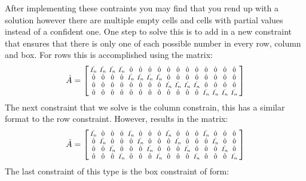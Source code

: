 \documentclass[12pt]{article}
\begin{document}
After implementing these contraints you may find that you rend up with a solution however there are multiple empty cells and cells with partial values instead of a
confident one. One step to solve this is to add in a new constraint that ensures that there is only one of each possible number in every row, column and box.
For rows this is accomplished using the matrix:
$$
\hat{A} =
\begin{bsmallmatrix}
\hat{I_n} & \hat{I_n} & \hat{I_n} & \hat{I_n} & \hat{0} & \hat{0} & \hat{0} & \hat{0} & \hat{0} & \hat{0} & \hat{0} & \hat{0} & \hat{0} & \hat{0} & \hat{0} & \hat{0} \\
\hat{0} & \hat{0} & \hat{0} & \hat{0} & \hat{I_n} & \hat{I_n} & \hat{I_n} & \hat{I_n} & \hat{0} & \hat{0} & \hat{0} & \hat{0} & \hat{0} & \hat{0} & \hat{0} & \hat{0} \\
\hat{0} & \hat{0} & \hat{0} & \hat{0} & \hat{0} & \hat{0} & \hat{0} & \hat{0} & \hat{I_n} & \hat{I_n} & \hat{I_n} & \hat{I_n} & \hat{0} & \hat{0} & \hat{0} & \hat{0} \\
\hat{0} & \hat{0} & \hat{0} & \hat{0} & \hat{0} & \hat{0} & \hat{0} & \hat{0} & \hat{0} & \hat{0} & \hat{0} & \hat{0} & \hat{I_n} & \hat{I_n} & \hat{I_n} & \hat{I_n} \\
\end{bsmallmatrix}
$$
The next constraint that we solve is the column constrain, this has a similar format to the row constraint. However, results in the matrix:
$$
\hat{A} =
\begin{bsmallmatrix}
\hat{I_n} & \hat{0} & \hat{0} & \hat{0} & \hat{I_n} & \hat{0} & \hat{0} & \hat{0} & \hat{I_n} & \hat{0} & \hat{0} & \hat{0} & \hat{I_n} & \hat{0} & \hat{0} & \hat{0} \\
\hat{0} & \hat{I_n} & \hat{0} & \hat{0} & \hat{0} & \hat{I_n} & \hat{0} & \hat{0} & \hat{0} & \hat{I_n} & \hat{0} & \hat{0} & \hat{0} & \hat{I_n} & \hat{0} & \hat{0} \\
\hat{0} & \hat{0} & \hat{I_n} & \hat{0} & \hat{0} & \hat{0} & \hat{I_n} & \hat{0} & \hat{0} & \hat{0} & \hat{I_n} & \hat{0} & \hat{0} & \hat{0} & \hat{I_n} & \hat{0} \\
\hat{0} & \hat{0} & \hat{0} & \hat{I_n} & \hat{0} & \hat{0} & \hat{0} & \hat{I_n} & \hat{0} & \hat{0} & \hat{0} & \hat{I_n} & \hat{0} & \hat{0} & \hat{0} & \hat{I_n} \\
\end{bsmallmatrix}
$$
The last constraint of this type is the box constraint of form:
\end{document}
